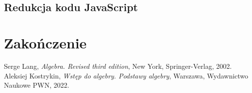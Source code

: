 \documentclass[licencjacka]{pracadypl}
\begin{document}
\section{Redukcja kodu JavaScript}

\chapter{Zakończenie}

\begin{thebibliography}{7}
%
Serge Lang, 
\textit{Algebra. Revised third edition}, 
New York, Springer-Verlag, 2002.
%
Aleksiej Kostrykin, 
\textit{Wstęp do algebry. Podstawy algebry},
Warszawa, Wydawnictwo Naukowe PWN, 2022.
\end{thebibliography}
\end{document}
